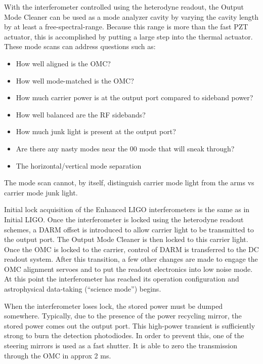 

With the interferometer controlled using the heterodyne readout, the
Output Mode Cleaner can be used as a mode analyzer cavity by varying
the cavity length by at least a free-spectral-range. Because this
range is more than the fast PZT actuator, this is accomplished by
putting a large step into the thermal actuator. These mode scans can
address questions such as:
\begin{itemize}
\item How well aligned is the OMC?
\item How well mode-matched is the OMC?
\item How much carrier power is at the output port compared to sideband
power?
\item How well balanced are the RF sidebands?
\item How much junk light is present at the output port?
\item Are there any nasty modes near the 00 mode that will sneak through?
\item The horizontal/vertical mode separation
\end{itemize}
The mode scan cannot, by itself, distinguish carrier mode light from
the arms vs carrier mode junk light.





Initial lock acquisition of the Enhanced LIGO interferometers is the
same as in Initial LIGO. Once the interferometer is locked using the
heterodyne readout schemes, a DARM offset is introduced to allow carrier
light to be transmitted to the output port. The Output Mode Cleaner
is then locked to this carrier light. Once the OMC is locked to the
carrier, control of DARM is transferred to the DC readout system.
After this transition, a few other changes are made to engage the
OMC alignment servoes and to put the readout electronics into low
noise mode. At this point the interferometer has reached its operation
configuration and astrophysical data-taking ({}``science mode'')
begins.



When the interferometer loses lock, the stored power must be dumped
somewhere. Typically, due to the presence of the power recycling mirror,
the stored power comes out the output port. This high-power transient
is sufficiently strong to burn the detection photodiodes. In order
to prevent this, one of the steering mirrors is used as a fast shutter.
It is able to zero the transmission through the OMC in approx 2 ms.
